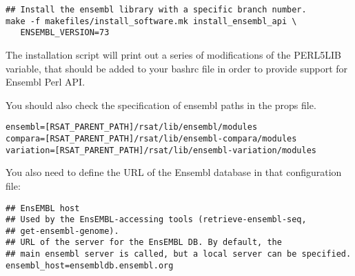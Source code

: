 \documentclass[12pt,a4paper, oneside]{scrreprt} %
\begin{document}
\begin{lstlisting}
## Install the ensembl library with a specific branch number.
make -f makefiles/install_software.mk install_ensembl_api \
   ENSEMBL_VERSION=73
\end{lstlisting}

The installation script will print out a series of modifications of
the PERL5LIB variable, that should be added to your bashrc file in
order to provide support for Ensembl Perl API.

You should also check the specification of ensembl paths in the props
file.

\begin{lstlisting}
ensembl=[RSAT_PARENT_PATH]/rsat/lib/ensembl/modules
compara=[RSAT_PARENT_PATH]/rsat/lib/ensembl-compara/modules
variation=[RSAT_PARENT_PATH]/rsat/lib/ensembl-variation/modules
\end{lstlisting}

You also need to define the URL of the Ensembl database in that
configuration file:

\begin{lstlisting}
## EnsEMBL host
## Used by the EnsEMBL-accessing tools (retrieve-ensembl-seq,
## get-ensembl-genome).
## URL of the server for the EnsEMBL DB. By default, the
## main ensembl server is called, but a local server can be specified.
ensembl_host=ensembldb.ensembl.org
\end{lstlisting}



\end{document}
